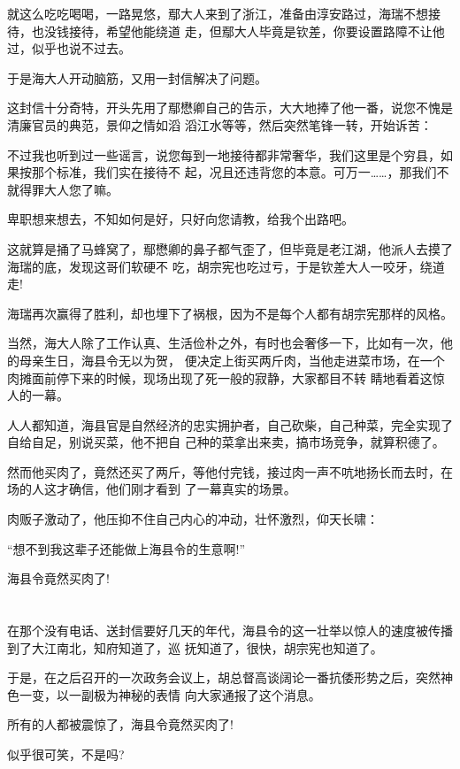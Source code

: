 \documentclass[11pt,a4paper,onecolumn]{article}
\begin{document}
就这么吃吃喝喝，一路晃悠，鄢大人来到了浙江，准备由淳安路过，海瑞不想接待，也没钱接待，希望他能绕道
走，但鄢大人毕竟是钦差，你要设置路障不让他过，似乎也说不过去。

于是海大人开动脑筋，又用一封信解决了问题。

这封信十分奇特，开头先用了鄢懋卿自己的告示，大大地捧了他一番，说您不愧是清廉官员的典范，景仰之情如滔
滔江水等等，然后突然笔锋一转，开始诉苦：

不过我也听到过一些谣言，说您每到一地接待都非常奢华，我们这里是个穷县，如果按那个标准，我们实在接待不
起，况且还违背您的本意。可万一……，那我们不就得罪大人您了嘛。

卑职想来想去，不知如何是好，只好向您请教，给我个出路吧。

这就算是捅了马蜂窝了，鄢懋卿的鼻子都气歪了，但毕竟是老江湖，他派人去摸了海瑞的底，发现这哥们软硬不
吃，胡宗宪也吃过亏，于是钦差大人一咬牙，绕道走!

海瑞再次赢得了胜利，却也埋下了祸根，因为不是每个人都有胡宗宪那样的风格。

当然，海大人除了工作认真、生活俭朴之外，有时也会奢侈一下，比如有一次，他的母亲生日，海县令无以为贺，
便决定上街买两斤肉，当他走进菜市场，在一个肉摊面前停下来的时候，现场出现了死一般的寂静，大家都目不转
睛地看着这惊人的一幕。

人人都知道，海县官是自然经济的忠实拥护者，自己砍柴，自己种菜，完全实现了自给自足，别说买菜，他不把自
己种的菜拿出来卖，搞市场竞争，就算积德了。

然而他买肉了，竟然还买了两斤，等他付完钱，接过肉一声不吭地扬长而去时，在场的人这才确信，他们刚才看到
了一幕真实的场景。

肉贩子激动了，他压抑不住自己内心的冲动，壮怀激烈，仰天长啸：

``想不到我这辈子还能做上海县令的生意啊!''

海县令竟然买肉了!

\section[\thesection]{}

在那个没有电话、送封信要好几天的年代，海县令的这一壮举以惊人的速度被传播到了大江南北，知府知道了，巡
抚知道了，很快，胡宗宪也知道了。

于是，在之后召开的一次政务会议上，胡总督高谈阔论一番抗倭形势之后，突然神色一变，以一副极为神秘的表情
向大家通报了这个消息。

所有的人都被震惊了，海县令竟然买肉了!

似乎很可笑，不是吗?
\end{document}
